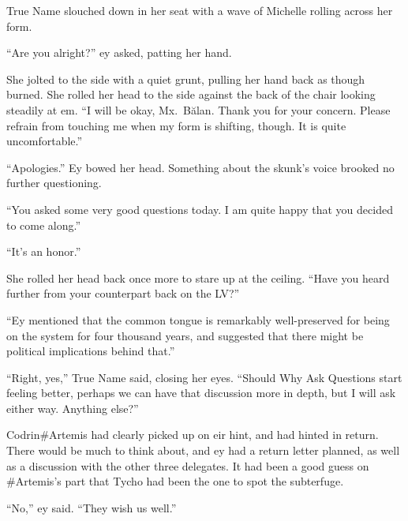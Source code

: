 True Name slouched down in her seat with a wave of Michelle rolling across her form.

``Are you alright?'' ey asked, patting her hand.

She jolted to the side with a quiet grunt, pulling her hand back as though burned. She rolled her head to the side against the back of the chair looking steadily at em. ``I will be okay, Mx.~Bălan. Thank you for your concern. Please refrain from touching me when my form is shifting, though. It is quite uncomfortable.''

``Apologies.'' Ey bowed her head. Something about the skunk's voice brooked no further questioning.

``You asked some very good questions today. I am quite happy that you decided to come along.''

``It's an honor.''

She rolled her head back once more to stare up at the ceiling. ``Have you heard further from your counterpart back on the LV?''

``Ey mentioned that the common tongue is remarkably well-preserved for being on the system for four thousand years, and suggested that there might be political implications behind that.''

``Right, yes,'' True Name said, closing her eyes. ``Should Why Ask Questions start feeling better, perhaps we can have that discussion more in depth, but I will ask either way. Anything else?''

Codrin\#Artemis had clearly picked up on eir hint, and had hinted in return. There would be much to think about, and ey had a return letter planned, as well as a discussion with the other three delegates. It had been a good guess on \#Artemis's part that Tycho had been the one to spot the subterfuge.

``No,'' ey said. ``They wish us well.''
